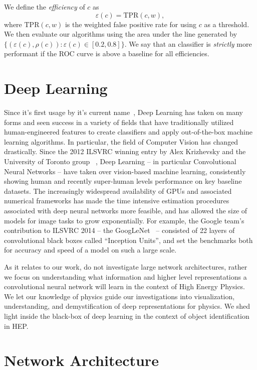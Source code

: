 \documentclass{article}
\begin{document}
We define the \emph{efficiency} of $c$ as 
$$
    \varepsilon(c) = \text{TPR}(c, w),
$$
where $\text{TPR}(c, w)$ is the weighted false positive rate for using $c$ as a threshold. We then evaluate our algorithms using the area under the line generated by $\{(\varepsilon(c), \rho(c)) : \varepsilon(c)\in [0.2, 0.8]\}$. We say that an classifier is \emph{strictly} more performant if the ROC curve is above a baseline for all efficiencies.



\section{Deep Learning}

Since it's first usage by it's current name~\cite{hinton06}, Deep Learning has taken on many forms and seen success in a variety of fields that have traditionally utilized human-engineered features to create classifiers and apply out-of-the-box machine learning algorithms. In particular, the field of Computer Vision has changed drastically. Since the 2012 ILSVRC winning entry by Alex Krizhevsky and the University of Toronto group ~\cite{alexnet}, Deep Learning -- in particular Convolutional Neural Networks -- have taken over vision-based machine learning, consistently showing human and recently super-human levels performance on key baseline datasets. The increasingly widespread availability of GPUs and associated numerical frameworks has made the time intensive estimation procedures associated with deep neural networks more feasible, and has allowed the size of models for image tasks to grow exponentially. For example, the Google team's contribution to ILSVRC 2014 -- the GoogLeNet~\cite{googlenet} -- consisted of 22 layers of convolutional black boxes called ``Inception Units'', and set the benchmarks both for accuracy and speed of a model on such a large scale. 

As it relates to our work, do not investigate large network architectures, rather we focus on  understanding what information and higher level representations a convolutional neural network will learn in the context of High Energy Physics. We let our knowledge of physics guide our investigations into visualization, understanding, and demystification of deep representations for physics. We shed light inside the black-box of deep learning in the context of object identification in HEP.


\section{Network Architecture}
\end{document}
